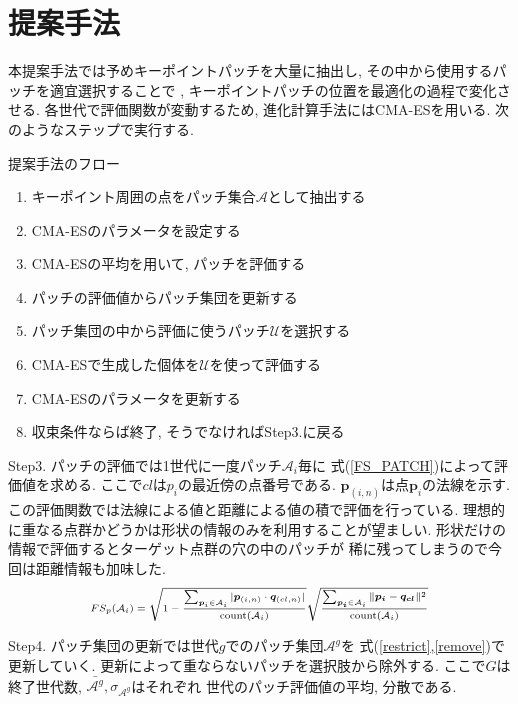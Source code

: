 \documentclass[twocolumn, 9pt, a4j, dvipdfmx]{jsarticle}
\begin{document}
\section{提案手法}
本提案手法では予めキーポイントパッチを大量に抽出し, 
その中から使用するパッチを適宜選択することで , 
キーポイントパッチの位置を最適化の過程で変化させる.
各世代で評価関数が変動するため, 進化計算手法にはCMA-ES\cite{CMA-ES}を用いる. 
次のようなステップで実行する. 
\begin{itembox}[l]{提案手法のフロー}
\vspace{-2mm}
\begin{enumerate}[Step1.]
    \item キーポイント周囲の点をパッチ集合$\mathcal{A}$として抽出する
    \item CMA-ESのパラメータを設定する
    \item CMA-ESの平均を用いて, パッチを評価する 
    \item パッチの評価値からパッチ集団を更新する 
    \item パッチ集団の中から評価に使うパッチ$\mathcal{U}$を選択する 
    \item CMA-ESで生成した個体を$\mathcal{U}$を使って評価する
    \item CMA-ESのパラメータを更新する 
    \item 収束条件ならば終了, そうでなければStep3.に戻る
\end{enumerate}
\vspace{-2mm}
\end{itembox}
Step3. パッチの評価では1世代に一度パッチ$\mathcal{A}_i$毎に
式(\ref{FS_PATCH})によって評価値を求める. 
ここで$cl$は$p_i$の最近傍の点番号である. 
$\bm{p}_{(i,n)}$は点$\bm{p}_i$の法線を示す. 
この評価関数では法線による値と距離による値の積で評価を行っている. 
理想的に重なる点群かどうかは形状の情報のみを利用することが望ましい. 
形状だけの情報で評価するとターゲット点群の穴の中のパッチが
稀に残ってしまうので今回は距離情報も加味した.
\begin{align}
    \label{FS_PATCH}
    \small
    FS_{p}(\mathcal{A}_i) = 
    \scriptsize
    \sqrt{1 -  
        \frac
        {\sum_{\bm{p}_i \in \mathcal{A}_i}|\bm{p}_{(i,n)} \cdot \bm{q}_{(cl,n)}|}
        {\text{count}(\mathcal{A}_i)} 
    } 
    \sqrt{
        \frac
        {\sum_{\bm{p_i}\in\mathcal{A}_i}\|\bm{p_i} - \bm{q_{cl}}\|^2}
        {\text{count}(\mathcal{A}_i)}
    }
\normalsize
\end{align}

Step4. パッチ集団の更新では世代$g$でのパッチ集団$\mathcal{A}^g$を
式(\ref{restrict},\ref{remove})で更新していく. 
更新によって重ならないパッチを選択肢から除外する. 
ここで$G$は終了世代数, $\bar{\mathcal{A}^g}, \sigma_{\mathcal{A}^g}$はそれぞれ
世代のパッチ評価値の平均, 分散である. 
\end{document}
